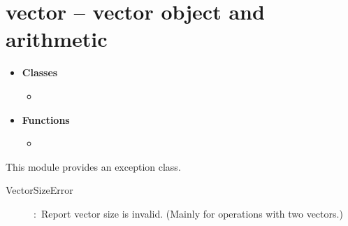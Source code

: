 

 \section{vector -- vector object and arithmetic}
 \begin{itemize}
   \item {\bf Classes}
   \begin{itemize}
     \item {}
   \end{itemize}
   \item {\bf Functions}
     \begin{itemize}
       \item {}
     \end{itemize}
 \end{itemize}

This module provides an exception class.
\begin{description}
  \item[VectorSizeError]:\ Report vector size is invalid. (Mainly for operations with two vectors.)
\end{description}

\C

